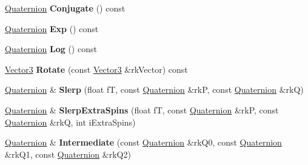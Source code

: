 \begin{DoxyCompactItemize}
\item 
\hyperlink{class_i_dream_sky_1_1_quaternion}{Quaternion} {\bfseries Conjugate} () const \hypertarget{class_i_dream_sky_1_1_quaternion_a0ee64800ff331f0a7d2572c86f98b83b}{}\label{class_i_dream_sky_1_1_quaternion_a0ee64800ff331f0a7d2572c86f98b83b}

\item 
\hyperlink{class_i_dream_sky_1_1_quaternion}{Quaternion} {\bfseries Exp} () const \hypertarget{class_i_dream_sky_1_1_quaternion_a07d48ec015cd306f7153e76dd30a5dde}{}\label{class_i_dream_sky_1_1_quaternion_a07d48ec015cd306f7153e76dd30a5dde}

\item 
\hyperlink{class_i_dream_sky_1_1_quaternion}{Quaternion} {\bfseries Log} () const \hypertarget{class_i_dream_sky_1_1_quaternion_aba19b376a57ec04ebb558c69a2c952ce}{}\label{class_i_dream_sky_1_1_quaternion_aba19b376a57ec04ebb558c69a2c952ce}

\item 
\hyperlink{class_i_dream_sky_1_1_vector3}{Vector3} {\bfseries Rotate} (const \hyperlink{class_i_dream_sky_1_1_vector3}{Vector3} \&rk\+Vector) const \hypertarget{class_i_dream_sky_1_1_quaternion_a1040a4d365ce5ca081ed5c3126b1b8b7}{}\label{class_i_dream_sky_1_1_quaternion_a1040a4d365ce5ca081ed5c3126b1b8b7}

\item 
\hyperlink{class_i_dream_sky_1_1_quaternion}{Quaternion} \& {\bfseries Slerp} (float fT, const \hyperlink{class_i_dream_sky_1_1_quaternion}{Quaternion} \&rkP, const \hyperlink{class_i_dream_sky_1_1_quaternion}{Quaternion} \&rkQ)\hypertarget{class_i_dream_sky_1_1_quaternion_af89b7c1613042ea126c8ff2a08284bac}{}\label{class_i_dream_sky_1_1_quaternion_af89b7c1613042ea126c8ff2a08284bac}

\item 
\hyperlink{class_i_dream_sky_1_1_quaternion}{Quaternion} \& {\bfseries Slerp\+Extra\+Spins} (float fT, const \hyperlink{class_i_dream_sky_1_1_quaternion}{Quaternion} \&rkP, const \hyperlink{class_i_dream_sky_1_1_quaternion}{Quaternion} \&rkQ, int i\+Extra\+Spins)\hypertarget{class_i_dream_sky_1_1_quaternion_a6c5399620b6a242c6e46f4db73788404}{}\label{class_i_dream_sky_1_1_quaternion_a6c5399620b6a242c6e46f4db73788404}

\item 
\hyperlink{class_i_dream_sky_1_1_quaternion}{Quaternion} \& {\bfseries Intermediate} (const \hyperlink{class_i_dream_sky_1_1_quaternion}{Quaternion} \&rk\+Q0, const \hyperlink{class_i_dream_sky_1_1_quaternion}{Quaternion} \&rk\+Q1, const \hyperlink{class_i_dream_sky_1_1_quaternion}{Quaternion} \&rk\+Q2)\hypertarget{class_i_dream_sky_1_1_quaternion_a7c13c49551714c6366075112eccaebf3}{}\label{class_i_dream_sky_1_1_quaternion_a7c13c49551714c6366075112eccaebf3}


\end{DoxyCompactItemize}
